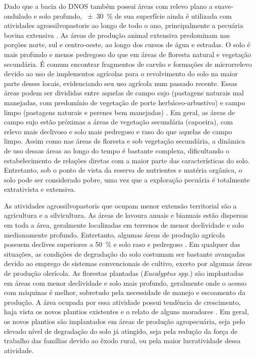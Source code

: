 Dado que a bacia do DNOS também possui áreas com relevo plano a suave-ondulado e solo profundo, 
\SI{\pm30}{\percent} de sua superfície ainda é utilizada com atividades agrossilvopastoris ao longo de todo o 
ano, principalmente a pecuária bovina extensiva \cite{SamuelRosaEtAl2011a}. As áreas de produção animal 
extensiva predominam nas porções norte, sul e centro-oeste, ao longo dos cursos de água e estradas. O solo é 
mais profundo e menos pedregoso do que em áreas de floresta natural e vegetação secundária. É comum encontrar 
fragmentos de carvão e formações de microrrelevo devido ao uso de implementos agrícolas para o revolvimento do 
solo na maior parte desses locais, evidenciando seu uso agrícola num passado recente. Essas áreas podem ser 
divididas entre aquelas de campo sujo (pastagens naturais mal manejadas, com predomínio de vegetação de porte 
herbáceo-arbustivo) e campo limpo (pastagens naturais e perenes bem manejadas) \cite{SamuelRosaEtAl2011a}. Em 
geral, as áreas de campo sujo estão próximas a áreas de vegetação secundária (capoeira), com relevo mais 
declivoso e solo mais pedregoso e raso do que aquelas de campo limpo. Assim como nas áreas de floresta e sob 
vegetação secundária, a dinâmica de uso dessas áreas ao longo do tempo é bastante complexa, dificultando o 
estabelecimento de relações diretas com a maior parte das características do solo. Entretanto, sob o ponto de 
vista da reserva de nutrientes e matéria orgânica, o solo pode ser considerado pobre, uma vez que a exploração 
pecuária é totalmente extrativista e extensiva.

As atividades agrossilvopastoris que ocupam menor extensão territorial são a agricultura e a silvicultura. As 
áreas de lavoura anuais e bianuais estão dispersas em toda a área, geralmente localizadas em terrenos de 
menor declividade e solo medianamente profundo. Entretanto, algumas áreas de produção agrícola possuem 
declives superiores a \SI{50}{\percent} e solo raso e pedregoso \cite{SamuelRosaEtAl2011a}. Em qualquer das 
situações, as condições de degradação do solo costumam ser bastante avançadas devido ao emprego de sistemas 
convencionais de cultivo, exceto por algumas áreas de produção olerícola. As florestas plantadas 
(\textit{Eucalyptus spp.}) são implantadas em áreas com menor declividade e solo mais profundo, geralmente 
onde o acesso com máquinas é melhor, sobretudo pela necessidade de manejo e escoamento da produção. A área 
ocupada por essa atividade possui tendência de crescimento, haja vista os novos plantios existentes e o relato 
de alguns moradores \cite{SamuelRosaEtAl2011a}. Em geral, os novos plantios são implantados em áreas de 
produção agropecuária, seja pelo elevado nível de degradação do solo já atingido, seja pela redução da força 
de trabalho das famílias devido ao êxodo rural, ou pela maior lucratividade dessa atividade.

